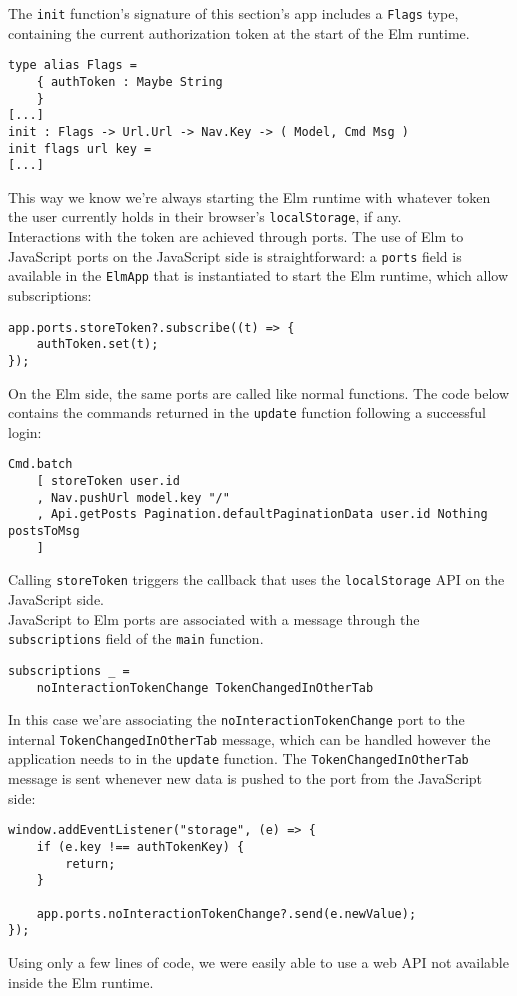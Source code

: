 The \texttt{init} function's signature of this section's app includes a \texttt{Flags} type, containing the current authorization token at the start of the Elm runtime. 
\begin{verbatim}
type alias Flags =
    { authToken : Maybe String
    }
[...]
init : Flags -> Url.Url -> Nav.Key -> ( Model, Cmd Msg )
init flags url key =
[...]
\end{verbatim}

This way we know we're always starting the Elm runtime with whatever token the user currently holds in their browser's \texttt{localStorage}, if any.\\

Interactions with the token are achieved through ports. The use of Elm to JavaScript ports on the JavaScript side is straightforward: a \texttt{ports} field is available in the \texttt{ElmApp} that is instantiated to start the Elm runtime, which allow subscriptions:
\begin{verbatim}
app.ports.storeToken?.subscribe((t) => {
    authToken.set(t);
});
\end{verbatim}
On the Elm side, the same ports are called like normal functions. The code below contains the commands returned in the \texttt{update} function following a successful login:
\begin{verbatim}
Cmd.batch
    [ storeToken user.id
    , Nav.pushUrl model.key "/"
    , Api.getPosts Pagination.defaultPaginationData user.id Nothing postsToMsg
    ]
\end{verbatim}
Calling \texttt{storeToken} triggers the callback that uses the \texttt{localStorage} API on the JavaScript side.\\

JavaScript to Elm ports are associated with a message through the \texttt{subscriptions} field of the \texttt{main} function.
\begin{verbatim}
subscriptions _ =
    noInteractionTokenChange TokenChangedInOtherTab
\end{verbatim}
In this case we'are associating the \texttt{noInteractionTokenChange} port to the internal \texttt{TokenChangedInOtherTab} message, which can be handled however the application needs to in the \texttt{update} function. The \texttt{TokenChangedInOtherTab} message is sent whenever new data is pushed to the port from the JavaScript side:
\begin{verbatim}
window.addEventListener("storage", (e) => {
    if (e.key !== authTokenKey) {
        return;
    }

    app.ports.noInteractionTokenChange?.send(e.newValue);
});
\end{verbatim}
Using only a few lines of code, we were easily able to use a web API not available inside the Elm runtime.


